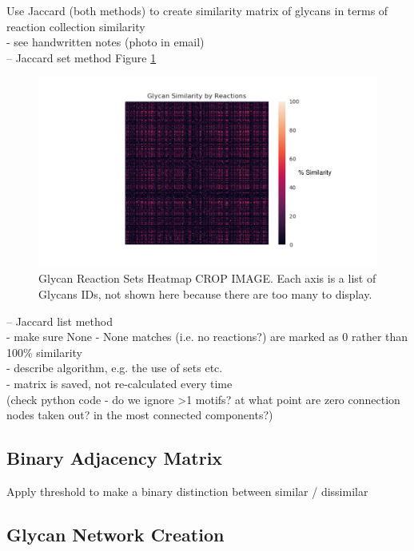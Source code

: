 \documentclass[12pt,a4paper]{article}
\begin{document}
Use Jaccard (both methods) to create similarity matrix of glycans in terms of reaction collection similarity\\
- see handwritten notes (photo in email)\\
-- Jaccard set method Figure \ref{fig:heatmap_set_method} \\
\begin{figure}[H]
\centering 
\includegraphics[scale=0.5]{images/heatmap_set_method.pdf} 
\caption{Glycan Reaction Sets Heatmap CROP IMAGE. Each axis is a list of Glycans IDs, not shown here because there are too many to display.}
\label{fig:heatmap_set_method}
\end{figure}

-- Jaccard list method\\
- make sure None - None matches (i.e. no reactions?) are marked as 0 rather than 100\% similarity\\
- describe algorithm, e.g. the use of sets etc.\\
- matrix is saved, not re-calculated every time\\

(check python code - do we ignore >1 motifs? at what point are zero connection nodes taken out? in the most connected components?)\\

\subsection{Binary Adjacency Matrix}
\label{sec:thresholding}

Apply threshold to make a binary distinction between similar / dissimilar \\

\subsection{Glycan Network Creation}
\label{sec:network_creation}
\end{document}

